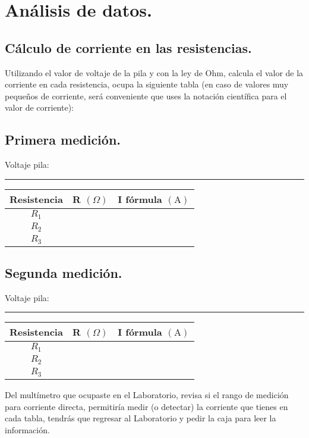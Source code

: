 \documentclass[14pt]{extarticle}
\begin{document}
\section{Análisis de datos.}

\subsection{Cálculo de corriente en las resistencias.}

Utilizando el valor de voltaje de la pila y con la ley de Ohm, calcula el valor de la corriente en cada resistencia, ocupa la siguiente tabla (en caso de valores muy pequeños de corriente, será conveniente que uses la notación científica para el valor de corriente):

\subsection*{Primera medición.}

Voltaje pila: \rule{2cm}{0.1mm}
\begin{table}[H]
\centering
\begin{tabular}{| c | c | c | } \hline
Resistencia & R $(\Omega)$ & I fórmula $(\si{\ampere})$ \\ \hline
$R_{1}$ & & \\ \hline
$R_{2}$ & & \\ \hline
$R_{3}$ & & \\ \hline
\end{tabular}
\end{table}

\subsection*{Segunda medición.}

Voltaje pila: \rule{2cm}{0.1mm}
\begin{table}[H]
\centering
\begin{tabular}{| c | c | c | } \hline
Resistencia & R $(\Omega)$ & I fórmula $(\si{\ampere})$ \\ \hline
$R_{1}$ & & \\ \hline
$R_{2}$ & & \\ \hline
$R_{3}$ & & \\ \hline
\end{tabular}
\end{table}

Del multímetro que ocupaste en el Laboratorio, revisa si el rango de medición para corriente directa, permitiría medir (o detectar) la corriente que tienes en cada tabla, tendrás que regresar al Laboratorio y pedir la caja para leer la información.
\end{document}
